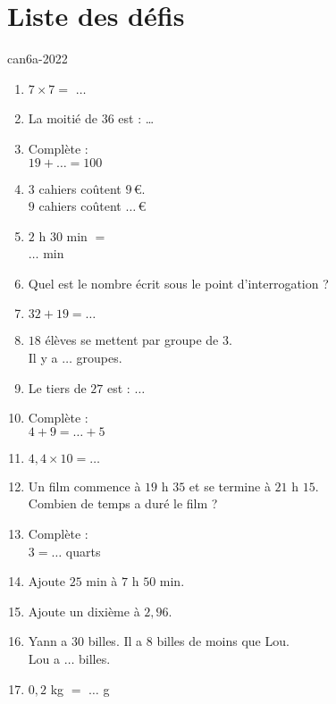 \section{Liste des défis}

\def\points{1}
\def\rdifficulty{3}
\begin{EXO}{}{can6a-2022}

    

	\begin{enumerate}[itemsep=1em, label=\arabic*)]
		\item {}$7 \times 7=$ $\ldots$
		\item {}La moitié de $36$ est : \ldots
		\item {}Complète : \\$19+\ldots =100$ 
		\item {}$3$ cahiers coûtent $9$\,\euro{}.\\ 				 $9$ cahiers coûtent $\ldots$\,\euro{}
		\item {}$2$ h $30$ min $=$ \\ $\ldots$ min
		\item {}Quel est le nombre écrit sous le point d'interrogation ?\\
		\item {}$32+19=$$\ldots$
		\item {}$18$ élèves se mettent par groupe de $3$. \\ 			  Il y a $\ldots$ groupes.
		\item {}Le tiers de $27$ est :  $\ldots$ 
		\item {}Complète :\\ 				$4+9=\ldots+5$
		\item {}$4{,}4\times 10=$$\ldots$
		\item {}Un film commence à $19$ h $35$ et se termine à $21$ h $15$.\\ 			  Combien de temps a duré le film ?
		\item {}Complète :\\$3=$$\ldots$ quarts
		\item {}Ajoute $25$ min à $7$ h $50$ min.
		\item {}Ajoute un dixième à $2{,}96$.
		\item {}Yann a $30$ billes. Il a $8$ billes de moins que Lou.\\ 				   Lou a $\ldots$ billes.
		\item {}$0{,}2$ kg  $=$   $\ldots$ g
$$
\end{enumerate}
\end{EXO}
